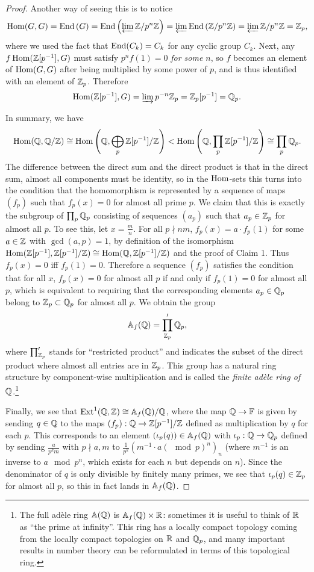 \begin{proof}
    Another way of seeing this is to notice
    \[\operatorname{Hom}(G,G)=\operatorname{End}\left(G\right)=\operatorname{End}\left(\varprojlim \mathbb{Z}\slash p^n\mathbb{Z} \right)=\varprojlim \operatorname{End}\left(\mathbb{Z}\slash p^n\mathbb{Z} \right)=\varprojlim \mathbb{Z}\slash p^n\mathbb{Z}=\mathbb{Z}_p,\]
    where we used the fact that $\operatorname{End}(C_k)=C_k$ for any cyclic group $C_k$. Next, any $f\operatorname{Hom}(\mathbb{Z}[p^{-1}],G)$ must satisfy $p^nf(1)=0$ \emph{for some $n$}, so $f$ becomes an element of $\operatorname{Hom}(G,G)$ after being multiplied by some power of $p$, and is thus identified with an element of $\mathbb{Z}_p$. Therefore
    \[\operatorname{Hom}(\mathbb{Z}[p^{-1}],G)=\varinjlim p^{-n}\mathbb{Z}_p=\mathbb{Z}_p[p^{-1}]=\mathbb{Q}_p.\]

    In summary, we have
    \[\operatorname{Hom}(\mathbb{Q},\mathbb{Q}\slash\mathbb{Z})\cong \operatorname{Hom}\left(\mathbb{Q},\bigoplus_p \mathbb{Z}[p^{-1}]\slash \mathbb{Z}\right)< \operatorname{Hom}\left(\mathbb{Q},\prod_p \mathbb{Z}[p^{-1}]\slash \mathbb{Z}\right)\cong \prod_p \mathbb{Q}_p.\]
    The difference between the direct sum and the direct product is that in the direct sum, almost all components must be identity, so in the $\operatorname{Hom}$-sets this turns into the condition that the homomorphism is represented by a sequence of maps $(f_p)$ such that $f_p(x)=0$ for almost all prime $p$. We claim that this is exactly the subgroup of $\prod_p\mathbb{Q}_p$ consisting of sequences $(a_p)$ such that $a_p\in\mathbb{Z}_p$ for almost all $p$. To see this, let $x=\frac mn$. For all $p\nmid nm$, $f_p(x)=a\cdot f_p(1)$ for some $a\in\mathbb{Z}$ with $\gcd(a,p)=1$, by definition of the isomorphism $\operatorname{Hom}(\mathbb{Z}[p^{-1}],\mathbb{Z}[p^{-1}]\slash \mathbb{Z})\cong \operatorname{Hom}(\mathbb{Q},\mathbb{Z}[p^{-1}]\slash\mathbb{Z})$ and the proof of Claim 1. Thus $f_p(x)=0$ iff $f_p(1)=0$. Therefore a sequence $(f_p)$ satisfies the condition that for all $x$, $f_p(x)=0$ for almost all $p$ if and only if $f_p(1)=0$ for almost all $p$, which is equivalent to requiring that the corresponding elements $a_p\in \mathbb{Q}_p$ belong to $\mathbb{Z}_p\subset \mathbb{Q}_p$ for almost all $p$. We obtain the group
    \[\mathbb{A}_f(\mathbb{Q})=\prod_{\mathbb{Z}_p}^\prime \mathbb{Q}_p,\]
    where $\prod^\prime_{\mathbb{Z}_p}$ stands for ``restricted product'' and indicates the subset of the direct product where almost all entries are in $\mathbb{Z}_p$. This group has a natural ring structure by component-wise multiplication and is called the \emph{finite ad\`ele ring of $\mathbb{Q}$}.\footnote{The full ad\`ele ring $\mathbb{A}(\mathbb{Q})$ is $\mathbb{A}_f(\mathbb{Q})\times \mathbb{R}$: sometimes it is useful to think of $\mathbb{R}$ as ``the prime at infinity''. This ring has a locally compact topology coming from the locally compact topologies on $\mathbb{R}$ and $\mathbb{Q}_p$, and many important results in number theory can be reformulated in terms of this topological ring.}
    
    Finally, we see that $\operatorname{Ext}^1(\mathbb{Q},\mathbb{Z})\cong \mathbb{A}_f(\mathbb{Q})\slash \mathbb{Q}$, where the map $\mathbb{Q}\to \mathbb{F}$ is given by sending $q\in\mathbb{Q}$ to the maps $(f_p):\mathbb{Q}\to \mathbb{Z}[p^{-1}]\slash\mathbb{Z}$ defined as multiplication by $q$ for each $p$. This corresponds to an element $(\iota_p(q)) \in \mathbb{A}_f(\mathbb{Q})$ with $\iota_p:\mathbb{Q}\to \mathbb{Q}_p$ defined by sending $\frac{a}{p^k m}$ with $p\nmid a,m$ to $\frac{1}{p^k}\left(m^{-1}\cdot a(\mod p)^n\right)_n$ (where $m^{-1}$ is an inverse to $a \mod p^n$, which exists for each $n$ but depends on $n$). Since the denominator of $q$ is only divisible by finitely many primes, we see that $\iota_p(q)\in\mathbb{Z}_p$ for almost all $p$, so this in fact lands in $\mathbb{A}_f(\mathbb{Q})$. 
\end{proof}
